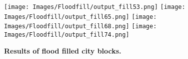 \documentclass{article}
\begin{document}
\begin{figure}
    \centering    
\texttt{[image: Images/Floodfill/output\_fill53.png]}     
\texttt{[image: Images/Floodfill/output\_fill65.png]} 
\texttt{[image: Images/Floodfill/output\_fill68.png]} 
\texttt{[image: Images/Floodfill/output\_fill74.png]} 
\caption{\bf Results of flood filled city blocks.}    
 \label{fig:floodfilled}  
\end{figure} 

%
%
%
%
%
%
%
%
%
\end{document}
